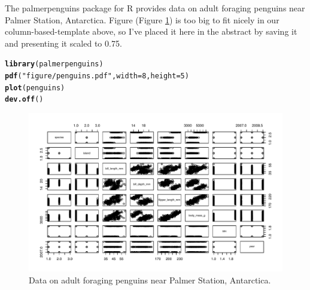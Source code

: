 \documentclass{article}\usepackage[]{graphicx}\usepackage[]{xcolor}
\makeatletter
\newcommand{\hlnum}[1]{\textcolor[rgb]{0.686,0.059,0.569}{#1}}%
\newcommand{\hlsng}[1]{\textcolor[rgb]{0.192,0.494,0.8}{#1}}%
\newcommand{\hldef}[1]{\textcolor[rgb]{0.345,0.345,0.345}{#1}}%
\newcommand{\hlkwc}[1]{\textcolor[rgb]{0.333,0.667,0.333}{#1}}%
\newcommand{\hlkwd}[1]{\textcolor[rgb]{0.737,0.353,0.396}{\textbf{#1}}}%
\newenvironment{kframe}{%
 \def\at@end@of@kframe{}%
 \ifinner\ifhmode%
  \def\at@end@of@kframe{\end{minipage}}%
  \begin{minipage}{\columnwidth}%
 \fi\fi%
 \def\FrameCommand##1{\hskip\@totalleftmargin \hskip-\fboxsep
 \colorbox{shadecolor}{##1}\hskip-\fboxsep
     \hskip-\linewidth \hskip-\@totalleftmargin \hskip\columnwidth}%
 \MakeFramed {\advance\hsize-\width
   \@totalleftmargin\z@ \linewidth\hsize
   \@setminipage}}%
 {\par\unskip\endMakeFramed%
 \at@end@of@kframe}
\newenvironment{knitrout}{}{} %
\makeatother
\begin{document}
  The palmerpenguins package for R \citep{palmerpenguins} provides data on adult foraging penguins near Palmer Station,
Antarctica. Figure (Figure \ref{Figure 2}) is too big to fit nicely in our column-based-template above, so I’ve placed it here in the abstract by
saving it and presenting it scaled to 0.75.



\begin{knitrout}\scriptsize
{}\color{fgcolor}\begin{kframe}
\begin{alltt}
\hlkwd{library}\hldef{(palmerpenguins)}
\hlkwd{pdf}\hldef{(}\hlsng{"figure/penguins.pdf"}\hldef{,} \hlkwc{width} \hldef{=} \hlnum{8}\hldef{,} \hlkwc{height} \hldef{=} \hlnum{5}\hldef{)}
\hlkwd{plot}\hldef{(penguins)}
\hlkwd{dev.off}\hldef{()}
\end{alltt}
\end{kframe}
\end{knitrout}

\begin{figure}[H]
\begin{center}
\includegraphics[scale=0.75]{figure/penguins.pdf}
\caption{Data on adult foraging penguins near Palmer Station, Antarctica.}
\label{Figure 2}
\end{center}
\end{figure}
\end{document}
